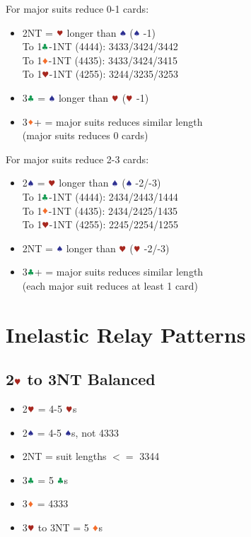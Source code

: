 \documentclass{article}
\newcommand*{\ccc}{\textcolor{ForestGreen}{\clubsuit}}
\newcommand*{\ddd}{\textcolor{Orange}{\vardiamondsuit}}
\newcommand*{\hhh}{\textcolor{Mahogany}{\varheartsuit}}
\newcommand*{\sss}{\textcolor{Blue}{\spadesuit}}
\begin{document}
\begin{multicols}{2}
\noindent For major suits reduce 0-1 cards:
\begin{itemize}
    \setlength\itemsep{-0.2em}
    \item 2NT = $\hhh$ longer than $\sss$ ($\sss$ -1) \\
        To 1$\ccc$-1NT (4444): 3433/3424/3442 \\
        To 1$\ddd$-1NT (4435): 3433/3424/3415 \\
        To 1$\hhh$-1NT (4255): 3244/3235/3253
    \item 3$\ccc$ = $\sss$ longer than $\hhh$ ($\hhh$ -1)
    \item 3$\ddd$+ = major suits reduces similar length \\
        (major suits reduces 0 cards)
\end{itemize}

\noindent For major suits reduce 2-3 cards:
\begin{itemize}
    \setlength\itemsep{-0.2em}
    \item 2$\sss$ = $\hhh$ longer than $\sss$ ($\sss$ -2/-3) \\
        To 1$\ccc$-1NT (4444): 2434/2443/1444 \\
        To 1$\ddd$-1NT (4435): 2434/2425/1435 \\
        To 1$\hhh$-1NT (4255): 2245/2254/1255
    \item 2NT = $\sss$ longer than $\hhh$ ($\hhh$ -2/-3)
    \item 3$\ccc$+ = major suits reduces similar length \\
        (each major suit reduces at least 1 card)
\end{itemize}

\section{Inelastic Relay Patterns}

\subsection{2$\hhh$ to 3NT Balanced}
\label{sec:2h-3nt-bal}

\begin{itemize}
    \setlength\itemsep{-0.2em}
    \item 2$\hhh$ = 4-5 $\hhh$s
    \item 2$\sss$ = 4-5 $\sss$s, not 4333
    \item 2NT = suit lengths $<=$ 3344
    \item 3$\ccc$ = 5 $\ccc$s
    \item 3$\ddd$ = 4333
    \item 3$\hhh$ to 3NT = 5 $\ddd$s
\end{itemize}


\end{multicols}
\end{document}
